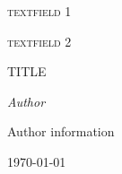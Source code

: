 \begin{titlepage}
	\centering
	\par\vspace{1cm}
	{\scshape\LARGE textfield 1 \par}
	\vspace{1cm}
	{\scshape\Large textfield 2\par}
	\vspace{1.5cm}
	{\large\scshape  TITLE \par}
	\vspace{2cm}
	{\Large\itshape Author\par}
    {\scriptsize Author information \par}

	\vfill

	{\large \today\par}
\end{titlepage}